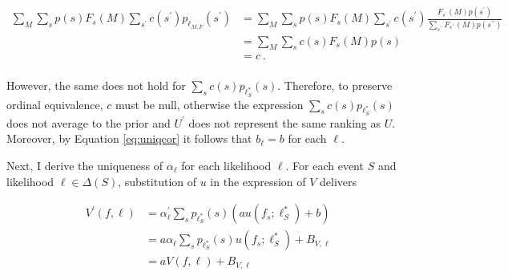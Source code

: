 \begin{corproof}
{		\begin{align*}
			\sum_{M } \sum_{s } p \left( s \right) F_s \left( M \right) \sum_{s^{\prime} } c \left( s^{\prime} \right) p_{\ell_{M,F}} \left( s^{\prime} \right) & = \sum_{M } \sum_{s } p \left( s \right) F_s \left( M \right) \sum_{s^{\prime} } c \left( s^{\prime} \right) \frac{F_{s^{\prime}} \left( M \right) p \left( s^{\prime} \right)}{\sum_{s^{\prime \prime} } F_{s^{\prime \prime}} \left( M \right) p \left( s^{\prime \prime} \right)} \\
			                                                                                                                                                    & = \sum_{M } \sum_{s } c \left( s \right) F_s \left( M \right) p \left( s \right)                                                                                                                                                                                                     \\
			                                                                                                                                                    & = c       \: .                                                                                                                                                                                                                                                                       \\
		\end{align*}

	} However, the same does not hold for \( \sum_{s} c \left( s \right) p_{\ell^{*}_{S}} \left( s \right) \). Therefore, to preserve ordinal equivalence, \( c \) must be null, otherwise the expression \( \sum_{s} c \left( s \right) p_{\ell^{*}_{S}} \left( s \right) \) does not average to the prior and \( U^{\prime} \) does not represent the same ranking as \( U \). Moreover, by Equation \eqref{eq:uniqcor} it follows that \( b_{\ell} = b \) for each \( \ell \).

	Next, I derive the uniqueness of \( \alpha_{\ell} \) for each likelihood \( \ell \). For each event \( S \) and likelihood \( \ell \in \Delta \left( S \right) \), substitution of \( u \) in the expression of \( V \) delivers

	\begin{align*}
		V^{\prime} \left( f, \ell \right) & = \alpha^{\prime}_{\ell} \sum_{s} p_{\ell^{*}_{S}} \left( s \right) \left( a u \left( f_{s} ; \ell^{*}_{S} \right) + b \right) \\
		                                  & = a \alpha_{\ell} \sum_{s} p_{\ell^{*}_{S}} \left( s \right) u \left( f_{s} ; \ell^{*}_{S} \right) + B_{V,\ell}                \\
		                                  & = a V \left( f, \ell \right) + B_{V,\ell}
	\end{align*}


\end{corproof}
